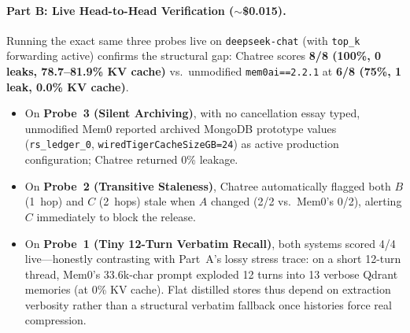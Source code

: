 \documentclass[10pt,twocolumn]{article}
\begin{document}
\begin{itemize}
\end{itemize}

\paragraph{Part B: Live Head-to-Head Verification ($\sim$\$0.015).}
Running the exact same three probes live on \texttt{deepseek-chat} (with \texttt{top\_k} forwarding active) confirms the structural gap: Chatree scores \textbf{8/8 (100\%, 0 leaks, 78.7--81.9\% KV cache)} vs.\ unmodified \texttt{mem0ai==2.2.1} at \textbf{6/8 (75\%, 1 leak, 0.0\% KV cache)}.
\begin{itemize}
  \item On \textbf{Probe~3 (Silent Archiving)}, with no cancellation essay typed, unmodified Mem0 reported archived MongoDB prototype values (\texttt{rs\_ledger\_0}, \texttt{wiredTigerCacheSizeGB=24}) as active production configuration; Chatree returned 0\% leakage.
  \item On \textbf{Probe~2 (Transitive Staleness)}, Chatree automatically flagged both $B$ (1~hop) and $C$ (2~hops) stale when $A$ changed (2/2 vs.\ Mem0's 0/2), alerting $C$ immediately to block the release.
  \item On \textbf{Probe~1 (Tiny 12-Turn Verbatim Recall)}, both systems scored 4/4 live—honestly contrasting with Part~A's lossy stress trace: on a short 12-turn thread, Mem0's 33.6k-char prompt exploded 12 turns into 13 verbose Qdrant memories (at 0\% KV cache). Flat distilled stores thus depend on extraction verbosity rather than a structural verbatim fallback once histories force real compression.
\end{itemize}
\end{document}
